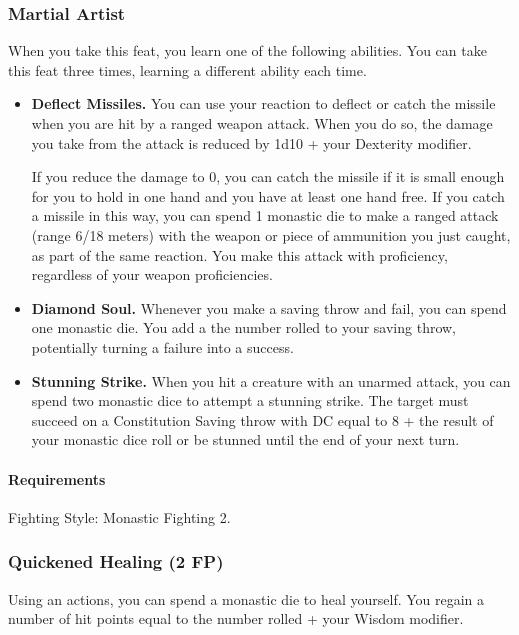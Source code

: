 \subsubsection{Martial Artist} \label{feat::martialartist}
    When you take this feat, you learn one of the following abilities.
    You can take this feat three times, learning a different ability each time.
    \begin{itemize}
        \item \textbf{Deflect Missiles.} You can use your reaction to deflect or catch the missile when you are hit by a ranged weapon attack.
        When you do so, the damage you take from the attack is reduced by 1d10 + your Dexterity modifier.

        If you reduce the damage to 0, you can catch the missile if it is small enough for you to hold in one hand and you have at least one hand free.
        If you catch a missile in this way, you can spend 1 monastic die to make a ranged attack (range 6/18 meters) with the weapon or piece of ammunition you just caught, as part of the same reaction.
        You make this attack with proficiency, regardless of your weapon proficiencies.

        \item \textbf{Diamond Soul.} Whenever you make a saving throw and fail, you can spend one monastic die.
        You add a the number rolled to your saving throw, potentially turning a failure into a success.

        \item \textbf{Stunning Strike.} When you hit a creature with an unarmed attack, you can spend two monastic dice to attempt a stunning strike.
        The target must succeed on a Constitution Saving throw with DC equal to 8 + the result of your monastic dice roll or be stunned until the end of your next turn.
    \end{itemize}

    \paragraph{Requirements} Fighting Style: Monastic Fighting 2.
\subsubsection{Quickened Healing (2 FP)} \label{feat::quickenedhealing}
    Using an actions, you can spend a monastic die to heal yourself.
    You regain a number of hit points equal to the number rolled + your Wisdom modifier.
